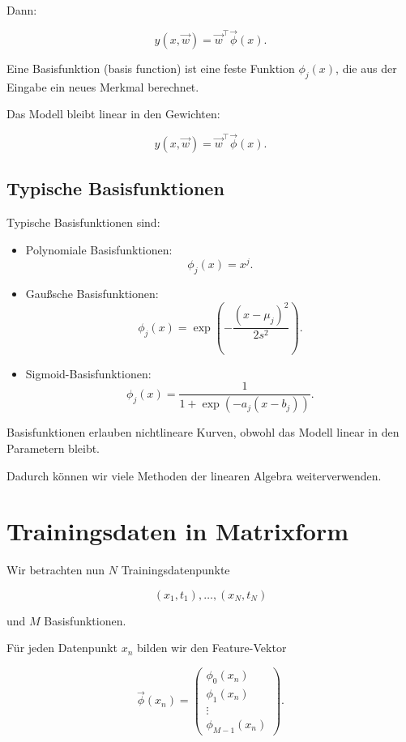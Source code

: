Dann:

\[
    y(x,\vec{w})
    =
    \vec{w}^{\top}\vec{\phi}(x).
\]

\begin{definitionbox}
Eine Basisfunktion (basis function) ist eine feste Funktion \(\phi_j(x)\), die aus der Eingabe ein neues Merkmal berechnet.

Das Modell bleibt linear in den Gewichten:

\[
    y(x,\vec{w})
    =
    \vec{w}^{\top}\vec{\phi}(x).
\]
\end{definitionbox}

\subsection{Typische Basisfunktionen}

Typische Basisfunktionen sind:

\begin{itemize}
    \item Polynomiale Basisfunktionen:
    \[
        \phi_j(x)=x^j.
    \]

    \item Gaußsche Basisfunktionen:
    \[
        \phi_j(x)
        =
        \exp\left(
            -\frac{(x-\mu_j)^2}{2s^2}
        \right).
    \]

    \item Sigmoid-Basisfunktionen:
    \[
        \phi_j(x)
        =
        \frac{1}{1+\exp(-a_j(x-b_j))}.
    \]
\end{itemize}

\begin{conceptbox}
Basisfunktionen erlauben nichtlineare Kurven, obwohl das Modell linear in den Parametern bleibt.

Dadurch können wir viele Methoden der linearen Algebra weiterverwenden.
\end{conceptbox}

\section{Trainingsdaten in Matrixform}

Wir betrachten nun \(N\) Trainingsdatenpunkte

\[
    (x_1,t_1),\dots,(x_N,t_N)
\]

und \(M\) Basisfunktionen.

Für jeden Datenpunkt \(x_n\) bilden wir den Feature-Vektor

\[
    \vec{\phi}(x_n)
    =
    \begin{pmatrix}
        \phi_0(x_n) \\
        \phi_1(x_n) \\
        \vdots \\
        \phi_{M-1}(x_n)
    \end{pmatrix}.
\]

